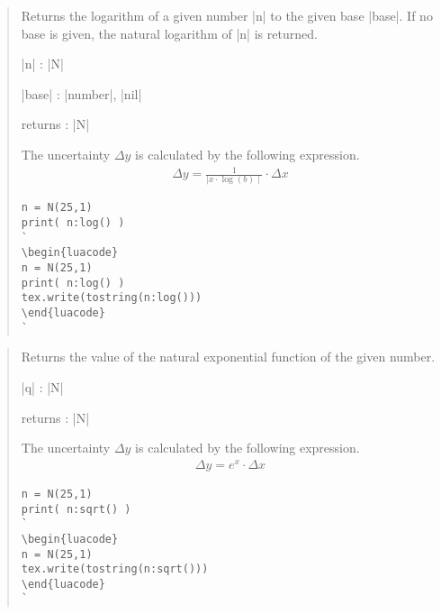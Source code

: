 \documentclass{ltxdoc}
\begin{document}
\begin{quote}
   Returns the logarithm of a given number |n| to the given base |base|. If no base is given, the natural logarithm of |n| is returned.

  \begin{description}
  \item |n| : |N|

  \item |base| : |number|, |nil|

  \item returns : |N|
  \end{description}

  The uncertainty $\Delta y$ is calculated by the following expression.
  \begin{align*}
    \Delta y = \frac{1}{\mid x \cdot \log(b) \mid} \cdot \Delta x
  \end{align*}

\begin{lstlisting}
n = N(25,1)
print( n:log() )
`
\begin{luacode}
n = N(25,1)
print( n:log() )
tex.write(tostring(n:log()))
\end{luacode}
`
\end{lstlisting}

\end{quote}



\begin{quote}
  Returns the value of the natural exponential function of the given number.

  \begin{description}
  \item |q| : |N|

  \item returns : |N|
  \end{description}

  The uncertainty $\Delta y$ is calculated by the following expression.
  \begin{align*}
    \Delta y = e^x \cdot \Delta x
  \end{align*}


\begin{lstlisting}
n = N(25,1)
print( n:sqrt() )
`
\begin{luacode}
n = N(25,1)
tex.write(tostring(n:sqrt()))
\end{luacode}
`
\end{lstlisting}

\end{quote}
\end{document}
